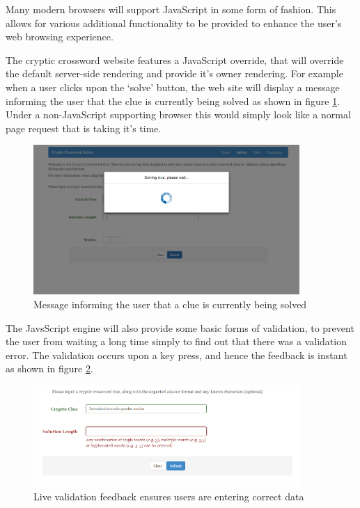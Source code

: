 Many modern browsers will support JavaScript in some form of fashion. This 
allows for various additional functionality to be provided to enhance the user's
web browsing experience.

The cryptic crossword website features a JavaScript override, that will override
the default server-side rendering and provide it's owner rendering. For example
when a user clicks upon the `solve' button, the web site will display a message
informing the user that the clue is currently being solved as shown in figure 
\ref{fig:solving_clue_message}. Under a non-JavaScript supporting browser this 
would simply look like a normal page request that is taking it's time.

\begin{figure}[H]
  \centering
  \includegraphics[width=0.9\textwidth]{implementation/images/solving_clue.png}
  \caption{Message informing the user that a clue is currently being solved}
  \label{fig:solving_clue_message}
\end{figure}

The JavsScript engine will also provide some basic forms of validation, to 
prevent the user from waiting a long time simply to find out that there was a 
validation error. The validation occurs upon a key press, and hence the feedback
is instant as shown in figure \ref{fig:validation_message}.

\begin{figure}[H]
  \centering
  \includegraphics[width=0.9\textwidth]{implementation/images/validation.png}
  \caption{Live validation feedback ensures users are entering correct data}
  \label{fig:validation_message}
\end{figure}

